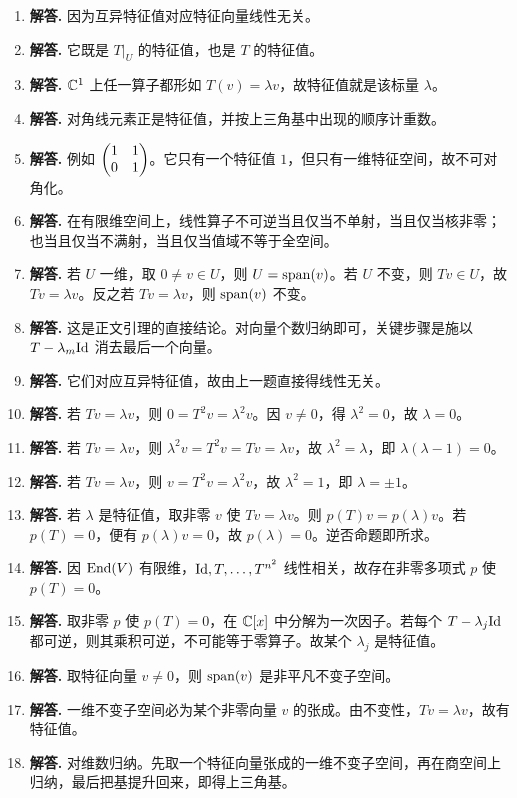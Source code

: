 \begin{enumerate}[label=\textbf{\arabic*.}, leftmargin=*, itemsep=1em]
\item \textbf{解答.} 因为互异特征值对应特征向量线性无关。
\item \textbf{解答.} 它既是 $T|_U$ 的特征值，也是 $T$ 的特征值。
\item \textbf{解答.} $\mathbb{C}^1$ 上任一算子都形如 $T(v)=\lambda v$，故特征值就是该标量 $\lambda$。
\item \textbf{解答.} 对角线元素正是特征值，并按上三角基中出现的顺序计重数。
\item \textbf{解答.} 例如 $\begin{pmatrix} 1&1\\0&1 \end{pmatrix}$。它只有一个特征值 $1$，但只有一维特征空间，故不可对角化。
\item \textbf{解答.} 在有限维空间上，线性算子不可逆当且仅当不单射，当且仅当核非零；也当且仅当不满射，当且仅当值域不等于全空间。
\item \textbf{解答.} 若 $U$ 一维，取 $0\neq v\in U$，则 $U=\operatorname{span}(v)$。若 $U$ 不变，则 $Tv\in U$，故 $Tv=\lambda v$。反之若 $Tv=\lambda v$，则 $\operatorname{span}(v)$ 不变。
\item \textbf{解答.} 这是正文引理的直接结论。对向量个数归纳即可，关键步骤是施以 $T-\lambda_m\mathrm{Id}$ 消去最后一个向量。
\item \textbf{解答.} 它们对应互异特征值，故由上一题直接得线性无关。
\item \textbf{解答.} 若 $Tv=\lambda v$，则 $0=T^2v=\lambda^2v$。因 $v\neq 0$，得 $\lambda^2=0$，故 $\lambda=0$。
\item \textbf{解答.} 若 $Tv=\lambda v$，则 $\lambda^2v=T^2v=Tv=\lambda v$，故 $\lambda^2=\lambda$，即 $\lambda(\lambda-1)=0$。
\item \textbf{解答.} 若 $Tv=\lambda v$，则 $v=T^2v=\lambda^2v$，故 $\lambda^2=1$，即 $\lambda=\pm1$。
\item \textbf{解答.} 若 $\lambda$ 是特征值，取非零 $v$ 使 $Tv=\lambda v$。则 $p(T)v=p(\lambda)v$。若 $p(T)=0$，便有 $p(\lambda)v=0$，故 $p(\lambda)=0$。逆否命题即所求。
\item \textbf{解答.} 因 $\mathrm{End}(V)$ 有限维，$\mathrm{Id},T,\dots,T^{n^2}$ 线性相关，故存在非零多项式 $p$ 使 $p(T)=0$。
\item \textbf{解答.} 取非零 $p$ 使 $p(T)=0$，在 $\mathbb{C}[x]$ 中分解为一次因子。若每个 $T-\lambda_j\mathrm{Id}$ 都可逆，则其乘积可逆，不可能等于零算子。故某个 $\lambda_j$ 是特征值。
\item \textbf{解答.} 取特征向量 $v\neq 0$，则 $\operatorname{span}(v)$ 是非平凡不变子空间。
\item \textbf{解答.} 一维不变子空间必为某个非零向量 $v$ 的张成。由不变性，$Tv=\lambda v$，故有特征值。
\item \textbf{解答.} 对维数归纳。先取一个特征向量张成的一维不变子空间，再在商空间上归纳，最后把基提升回来，即得上三角基。

\end{enumerate}
